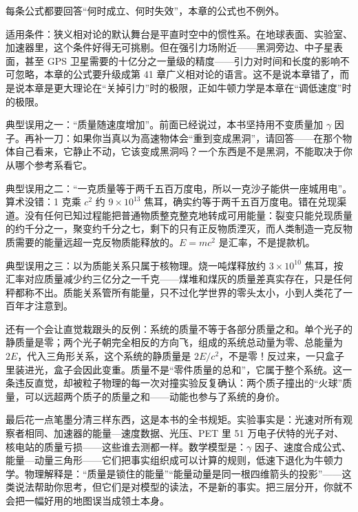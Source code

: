 
\begin{mainline}
每条公式都要回答“何时成立、何时失效”，本章的公式也不例外。

适用条件：狭义相对论的默认舞台是平直时空中的惯性系。在地球表面、实验室、加速器里，这个条件好得无可挑剔。但在强引力场附近——黑洞旁边、中子星表面，甚至 GPS 卫星需要的十亿分之一量级的精度——引力对时间和长度的影响不可忽略，本章的公式要升级成第 41 章广义相对论的语言。这不是说本章错了，而是说本章是更大理论在“关掉引力”时的极限，正如牛顿力学是本章在“调低速度”时的极限。

典型误用之一：“质量随速度增加”。前面已经说过，本书坚持用不变质量加 \(\gamma\) 因子。再补一刀：如果你当真以为高速物体会“重到变成黑洞”，请回答——在那个物体自己看来，它静止不动，它该变成黑洞吗？一个东西是不是黑洞，不能取决于你从哪个参考系看它。

典型误用之二：“一克质量等于两千五百万度电，所以一克沙子能供一座城用电”。算术没错：1 克乘 \(c^{2}\) 约 \(9\times10^{13}\) 焦耳，确实约等于两千五百万度电。错在兑现渠道。没有任何已知过程能把普通物质整克整克地转成可用能量：裂变只能兑现质量的约千分之一，聚变约千分之七，剩下的只有正反物质湮灭，而人类制造一克反物质需要的能量远超一克反物质能释放的。\(E=mc^{2}\) 是汇率，不是提款机。

典型误用之三：以为质能关系只属于核物理。烧一吨煤释放约 \(3\times10^{10}\) 焦耳，按汇率对应质量减少约三亿分之一千克——煤堆和煤灰的质量差真实存在，只是任何秤都称不出。质能关系管所有能量，只不过化学世界的零头太小，小到人类花了一百年才注意到。

还有一个会让直觉栽跟头的反例：系统的质量不等于各部分质量之和。单个光子的静质量是零；两个光子朝完全相反的方向飞，组成的系统总动量为零、总能量为 \(2E\)，代入三角形关系，这个系统的静质量是 \(2E/c^{2}\)，不是零！反过来，一只盒子里装进光，盒子会因此变重。质量不是“零件质量的总和”，它属于整个系统。这一条违反直觉，却被粒子物理的每一次对撞实验反复确认：两个质子撞出的“火球”质量，可以远超两个质子的质量之和——动能也参与了系统的身价。

最后花一点笔墨分清三样东西，这是本书的全书规矩。实验事实是：光速对所有观察者相同、加速器的能量—速度数据、光压、PET 里 51 万电子伏特的光子对、核电站的质量亏损——这些谁去测都一样。数学模型是：\(\gamma\) 因子、速度合成公式、能量—动量三角形——它们把事实组织成可以计算的规则，低速下退化为牛顿力学。物理解释是：“质量是锁住的能量”“能量动量是同一根四维箭头的投影”——这类说法帮助你思考，但它们是对模型的读法，不是新的事实。把三层分开，你就不会把一幅好用的地图误当成领土本身。
\end{mainline}

